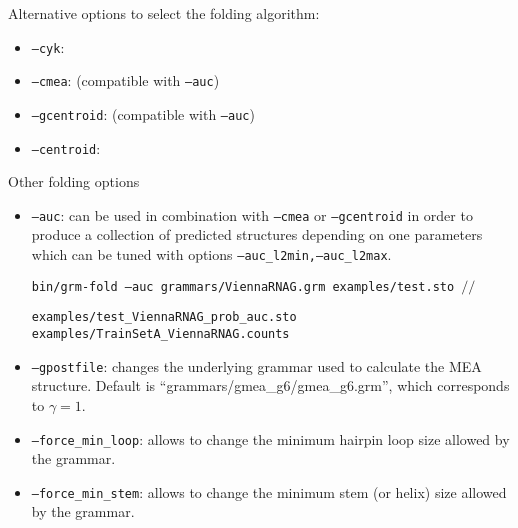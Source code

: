 \noindent
Alternative options to select the folding algorithm:
\begin{itemize}
\item \texttt{--cyk}: 
\item \texttt{--cmea}: (compatible with \texttt{--auc})

\item \texttt{--gcentroid}:  (compatible with \texttt{--auc})
\item \texttt{--centroid}: 
\end{itemize}

\noindent
Other folding options
\begin{itemize}
\item \texttt{--auc}: can be used in combination with \texttt{--cmea}
  or \texttt{--gcentroid} in order to produce a collection of predicted
  structures depending on one parameters which can be tuned with
  options \texttt{--auc\_l2min,--auc\_l2max}.\\

\begin{footnotesize}
\texttt{bin/grm-fold --auc grammars/ViennaRNAG.grm examples/test.sto $//$}

\hspace{15mm}\texttt{examples/test\_ViennaRNAG\_prob\_auc.sto examples/TrainSetA\_ViennaRNAG.counts}\\
\end{footnotesize}

\item \texttt{--gpostfile}: changes the underlying grammar used to
  calculate the MEA structure.  Default is
  ``grammars/gmea\_g6/gmea\_g6.grm'', which corresponds to
  $\gamma=1$.
 
\item \texttt{--force\_min\_loop}: allows to change the minimum
  hairpin loop size allowed by the grammar.

\item \texttt{--force\_min\_stem}: allows to change the minimum stem
  (or helix) size allowed by the grammar.
\end{itemize}

